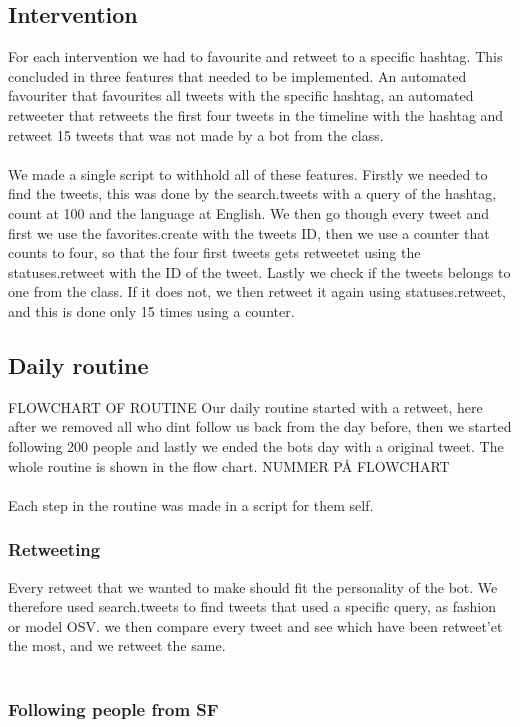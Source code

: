 
\subsection{Intervention}
For each intervention we had to favourite and retweet to a specific hashtag. This concluded in three features that needed to be implemented. An automated favouriter that favourites all tweets with the specific hashtag, an automated retweeter that retweets the first four tweets in the timeline with the hashtag and retweet 15 tweets that was not made by a bot from the class.\\
\\
We made a single script to withhold all of these features. Firstly we needed to find the tweets, this was done by the search.tweets with a query of the hashtag, count at 100 and the language at English. We then go though every tweet and first we use the favorites.create with the tweets ID, then we use a counter that counts to four, so that the four first tweets gets retweetet using the statuses.retweet with the ID of the tweet. Lastly we check if the tweets belongs to one from the class. If it does not, we then retweet it again using statuses.retweet, and this is done only 15 times using a counter.

\subsection{Daily routine}
FLOWCHART OF ROUTINE
Our daily routine started with a retweet, here after we removed all who dint follow us back from the day before, then we started following 200 people and lastly we ended the bots day with a original tweet. The whole routine is shown in the flow chart. NUMMER PÅ FLOWCHART\\
\\
Each step in the routine was made in a script for them self. 

\subsubsection{Retweeting}
Every retweet that we wanted to make should fit the personality of the bot. We therefore used search.tweets to find tweets that used a specific query, as fashion or model OSV. we then compare every tweet and see which have been retweet'et the most, and we retweet the same.\\
\\

\subsubsection{Following people from SF}


